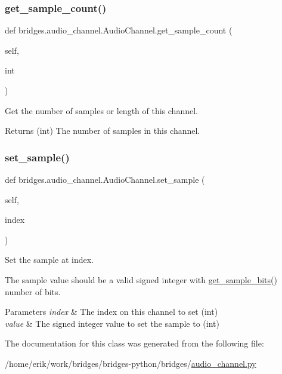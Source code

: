 \subsubsection{\texorpdfstring{get\+\_\+sample\+\_\+count()}{get\_sample\_count()}}
{\footnotesize\ttfamily def bridges.\+audio\+\_\+channel.\+Audio\+Channel.\+get\+\_\+sample\+\_\+count (\begin{DoxyParamCaption}\item[{}]{self,  }\item[{}]{int }\end{DoxyParamCaption})}



Get the number of samples or length of this channel. 

\begin{DoxyReturn}{Returns}
(int) The number of samples in this channel. 
\end{DoxyReturn}
\mbox{\label{classbridges_1_1audio__channel_1_1_audio_channel_adc84cb1c65d84184353603d9fd051017}} 
\subsubsection{\texorpdfstring{set\+\_\+sample()}{set\_sample()}}
{\footnotesize\ttfamily def bridges.\+audio\+\_\+channel.\+Audio\+Channel.\+set\+\_\+sample (\begin{DoxyParamCaption}\item[{}]{self,  }\item[{}]{index }\end{DoxyParamCaption})}



Set the sample at index. 

The sample value should be a valid signed integer with \hyperlink{classbridges_1_1audio__channel_1_1_audio_channel_ae9b2e6e0f5aaebc5adc21815f4fe2f9a}{get\+\_\+sample\+\_\+bits()} number of bits.


\begin{DoxyParams}{Parameters}
{\em index} & The index on this channel to set (int) \\
\hline
{\em value} & The signed integer value to set the sample to (int) \\
\hline
\end{DoxyParams}


The documentation for this class was generated from the following file\+:\begin{DoxyCompactItemize}
\item 
/home/erik/work/bridges/bridges-\/python/bridges/\hyperlink{audio__channel_8py}{audio\+\_\+channel.\+py}\end{DoxyCompactItemize}
